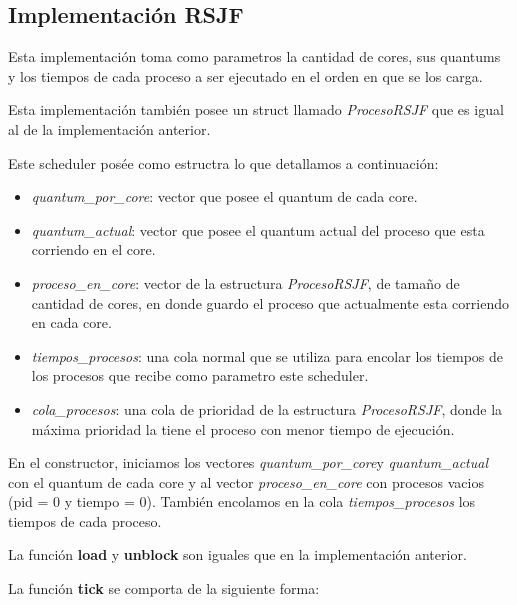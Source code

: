 \subsection{Implementación \textbf{RSJF}}

Esta implementación toma como parametros la cantidad de cores, sus quantums y los tiempos de cada proceso a ser ejecutado en el orden en que se los carga.

Esta implementación también posee un struct llamado \emph{ProcesoRSJF} que es igual al de la implementación anterior.

Este scheduler posée como estructra lo que detallamos a continuación:

\begin{itemize}

\item \emph{quantum\_por\_core}: vector que posee el quantum de cada core.

\item \emph{quantum\_actual}: vector que posee el quantum actual del proceso que esta corriendo en el core.

\item \emph{proceso\_en\_core}: vector de la estructura \emph{ProcesoRSJF}, de tamaño de cantidad de cores, en donde guardo el proceso que actualmente esta corriendo en cada core.

\item \emph{tiempos\_procesos}: una cola normal que se utiliza para encolar los tiempos de los procesos que recibe como parametro este scheduler.

\item \emph{cola\_procesos}: una cola de prioridad de la estructura \emph{ProcesoRSJF}, donde la máxima prioridad la tiene el proceso con menor tiempo de ejecución.

\end{itemize}

En el constructor, iniciamos los vectores \emph{quantum\_por\_core}y \emph{quantum\_actual} con el quantum de cada core y al vector \emph{proceso\_en\_core} con procesos vacios (pid = 0 y tiempo = 0). También encolamos en la cola \emph{tiempos\_procesos} los tiempos de cada proceso.

La función \textbf{load} y \textbf{unblock} son iguales que en la implementación anterior.

La función \textbf{tick} se comporta de la siguiente forma:

~

